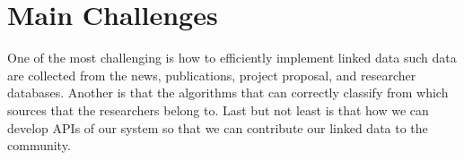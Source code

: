 \section{Main Challenges}
\label{sec:challenges}
One of the most challenging is how to efficiently implement linked data such data are collected from the news, publications,  project proposal, and researcher databases. Another is that the algorithms that can correctly classify from which sources that the researchers belong to. Last but not least is that how we can develop APIs of our system so that we can contribute our linked data to the community.

